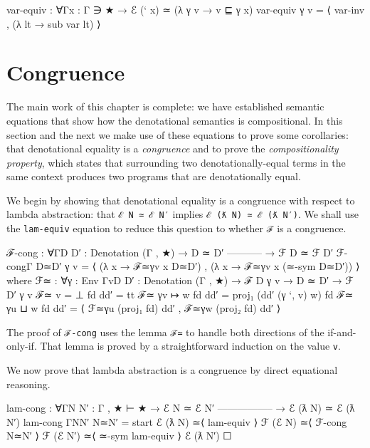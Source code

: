 \begin{fence}
\begin{code}
var-equiv : ∀{Γ}{x : Γ ∋ ★} → ℰ (` x) ≃ (λ γ v → v ⊑ γ x)
var-equiv γ v = ⟨ var-inv , (λ lt → sub var lt) ⟩
\end{code}
\end{fence}

\hypertarget{congruence}{%
\section{Congruence}\label{congruence}}

The main work of this chapter is complete: we have established semantic
equations that show how the denotational semantics is compositional. In
this section and the next we make use of these equations to prove some
corollaries: that denotational equality is a \emph{congruence} and to
prove the \emph{compositionality property}, which states that
surrounding two denotationally-equal terms in the same context produces
two programs that are denotationally equal.

We begin by showing that denotational equality is a congruence with
respect to lambda abstraction: that \texttt{ℰ\ N\ ≃\ ℰ\ N′} implies
\texttt{ℰ\ (ƛ\ N)\ ≃\ ℰ\ (ƛ\ N′)}. We shall use the \texttt{lam-equiv}
equation to reduce this question to whether \texttt{ℱ} is a congruence.

\begin{fence}
\begin{code}
ℱ-cong : ∀{Γ}{D D′ : Denotation (Γ , ★)}
  → D ≃ D′
    -----------
  → ℱ D ≃ ℱ D′
ℱ-cong{Γ} D≃D′ γ v =
  ⟨ (λ x → ℱ≃{γ}{v} x D≃D′) , (λ x → ℱ≃{γ}{v} x (≃-sym D≃D′)) ⟩
  where
  ℱ≃ : ∀{γ : Env Γ}{v}{D D′ : Denotation (Γ , ★)}
    → ℱ D γ v  →  D ≃ D′ → ℱ D′ γ v
  ℱ≃ {v = ⊥} fd dd′ = tt
  ℱ≃ {γ}{v ↦ w} fd dd′ = proj₁ (dd′ (γ `, v) w) fd
  ℱ≃ {γ}{u ⊔ w} fd dd′ = ⟨ ℱ≃{γ}{u} (proj₁ fd) dd′ , ℱ≃{γ}{w} (proj₂ fd) dd′ ⟩
\end{code}
\end{fence}

The proof of \texttt{ℱ-cong} uses the lemma \texttt{ℱ≃} to handle both
directions of the if-and-only-if. That lemma is proved by a
straightforward induction on the value \texttt{v}.

We now prove that lambda abstraction is a congruence by direct
equational reasoning.

\begin{fence}
\begin{code}
lam-cong : ∀{Γ}{N N′ : Γ , ★ ⊢ ★}
  → ℰ N ≃ ℰ N′
    -----------------
  → ℰ (ƛ N) ≃ ℰ (ƛ N′)
lam-cong {Γ}{N}{N′} N≃N′ =
  start
    ℰ (ƛ N)
  ≃⟨ lam-equiv ⟩
    ℱ (ℰ N)
  ≃⟨ ℱ-cong N≃N′ ⟩
    ℱ (ℰ N′)
  ≃⟨ ≃-sym lam-equiv ⟩
    ℰ (ƛ N′)
  ☐
\end{code}
\end{fence}

